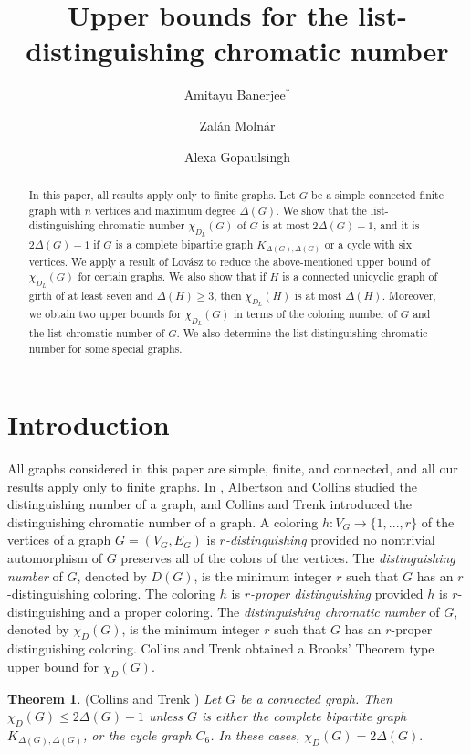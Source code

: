 \documentclass[12pt,reqno,a4paper]{amsart}
\title[list-distinguishing chromatic numbers]{Upper bounds for the list-distinguishing chromatic number}
\author{Amitayu Banerjee$^{\ast}$}
\author{Zal\'{a}n Moln\'{a}r}
\author{Alexa Gopaulsingh}
\date{}
\theoremstyle{definition}
\newtheorem{thm}[defn]{Theorem}
\begin{document}
\begin{abstract}
In this paper, all results apply only to finite graphs.
Let $G$ be a simple connected finite graph with $n$ vertices and maximum degree $\Delta(G)$.
We show that the list-distinguishing chromatic number $\chi_{D_{L}}(G)$ of $G$ is at most $2\Delta(G)-1$, and it is $2\Delta(G)-1$ if $G$ is a complete bipartite graph $K_{\Delta(G),\Delta(G)}$ or a cycle with six vertices.
We apply a result of Lov\'{a}sz to reduce the above-mentioned upper bound of $\chi_{D_{L}}(G)$ for certain graphs. 
We also show that if $H$ is a connected unicyclic graph of girth of at least seven and $\Delta(H)\geq 3$, then $\chi_{D_{L}}(H)$ is at most $\Delta(H)$.
Moreover, we obtain two upper bounds for $\chi_{D_{L}}(G)$ in terms of the coloring number of $G$ and the list chromatic number of $G$.
We also determine the list-distinguishing chromatic number for some special graphs.
\end{abstract}

\maketitle
\section{Introduction}
All graphs considered in this paper are simple, finite, and connected, and all our results apply only to finite graphs. In \cite{AC1996}, Albertson and Collins studied the distinguishing number of a graph, and Collins and Trenk \cite{CT2006} introduced the distinguishing chromatic number of a graph. 
A coloring $h:V_{G}\rightarrow\{1,...,r\}$ of the vertices of a graph $G=(V_{G}, E_{G})$ is {\em $r$-distinguishing} provided no nontrivial automorphism of $G$ preserves all of the colors of the vertices. The {\em distinguishing number} of $G$, denoted by $D(G)$, is the minimum integer $r$ such that $G$ has an $r$-distinguishing coloring. The coloring $h$ is {\em $r$-proper distinguishing} provided $h$ is $r$-distinguishing and a proper coloring. The {\em distinguishing chromatic number} of $G$, denoted by $\chi_{D}(G)$, is the minimum integer $r$ such that $G$ has an $r$-proper distinguishing coloring.
Collins and Trenk \cite{CT2006} obtained a Brooks' Theorem type upper bound for $\chi_{D}(G)$.

\begin{thm}\label{Theorem 1.1}{(Collins and Trenk \cite[Theorem 4.5]{CT2006})}
{\em Let $G$ be a connected graph. Then $\chi_{D}(G)\leq 2\Delta(G)-1$ unless $G$ is either the complete bipartite graph $K_{\Delta(G),\Delta(G)}$, or the cycle graph $C_{6}$. In these cases, $\chi_{D}(G) = 2\Delta(G)$}.    
\end{thm}
\end{document}
